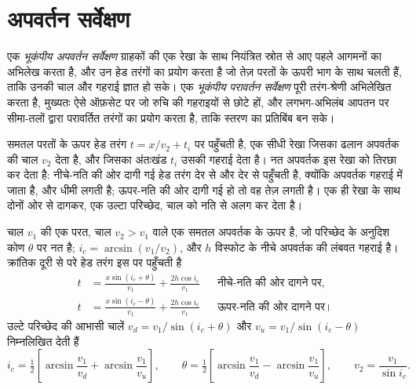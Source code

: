\section{अपवर्तन सर्वेक्षण}

\begin{definition}[भूकंपीय अपवर्तन और परावर्तन सर्वेक्षण]\label{def:b3:exploration-seismology:surveys}
एक \emph{भूकंपीय अपवर्तन सर्वेक्षण} ग्राहकों की एक रेखा के साथ
नियंत्रित स्रोत से आए पहले आगमनों का अभिलेख करता है, और उन हेड तरंगों का
प्रयोग करता है जो तेज़ परतों के ऊपरी भाग के साथ चलती हैं, ताकि उनकी चाल और
गहराई ज्ञात हो सके। एक \emph{भूकंपीय परावर्तन सर्वेक्षण}
पूरी तरंग-श्रेणी अभिलेखित करता है, मुख्यतः ऐसे ऑफ़सेट पर जो रुचि की गहराइयों से छोटे हों,
और लगभग-अभिलंब आपतन पर सीमा-तलों द्वारा परावर्तित तरंगों का
प्रयोग करता है, ताकि स्तरण का प्रतिबिंब बन सके।
\end{definition}

समतल परतों के ऊपर हेड तरंग $t = x/v_2 + t_i$ पर पहुँचती है, एक सीधी रेखा
जिसका ढलान अपवर्तक की चाल $v_2$ देता है, और जिसका अंतःखंड $t_i$
उसकी गहराई देता है। नत अपवर्तक इस रेखा को तिरछा कर देता है: नीचे-नति की ओर दागी गई
हेड तरंग देर से और देर से पहुँचती है, क्योंकि अपवर्तक गहराई में जाता है, और धीमी लगती है;
ऊपर-नति की ओर दागी गई हो तो वह तेज़ लगती है। एक ही रेखा के साथ दोनों ओर से दागकर, एक उल्टा
परिच्छेद, चाल को नति से अलग कर देता है।

\begin{theorem}[नत सीमा पर अपवर्तन]\label{thm:b3:exploration-seismology:dipping}
चाल $v_1$ की एक परत, चाल $v_2 > v_1$ वाले एक समतल अपवर्तक के ऊपर है, जो
परिच्छेद के अनुदिश कोण $\theta$ पर नत है; $i_c = \arcsin(v_1/v_2)$, और $h$
विस्फोट के नीचे अपवर्तक की लंबवत गहराई है। क्रांतिक
दूरी से परे हेड तरंग इस पर पहुँचती है
\begin{align*}
  t &= \frac{x\sin(i_c + \theta)}{v_1} + \frac{2h\cos i_c}{v_1}
  &&\text{नीचे-नति की ओर दागने पर},\\
  t &= \frac{x\sin(i_c - \theta)}{v_1} + \frac{2h\cos i_c}{v_1}
  &&\text{ऊपर-नति की ओर दागने पर}।
\end{align*}
उल्टे परिच्छेद की आभासी चालें $v_d = v_1/\sin(i_c + \theta)$ और
$v_u = v_1/\sin(i_c - \theta)$ निम्नलिखित देती हैं
\[
  i_c = \tfrac12\left[\arcsin\frac{v_1}{v_d} + \arcsin\frac{v_1}{v_u}\right],\qquad
  \theta = \tfrac12\left[\arcsin\frac{v_1}{v_d} - \arcsin\frac{v_1}{v_u}\right],
  \qquad v_2 = \frac{v_1}{\sin i_c} .
\]
\end{theorem}

